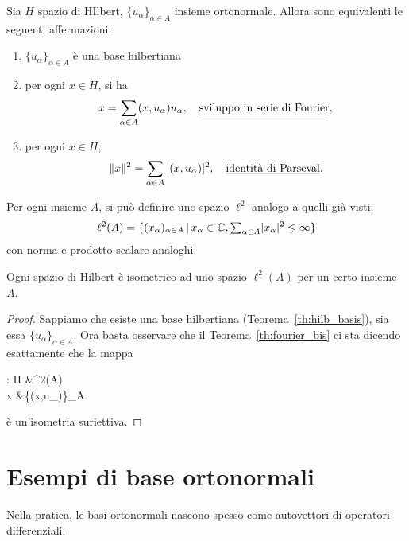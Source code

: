 \begin{theorem}
\label{th:fourier_bis}
	Sia $H$ spazio di HIlbert, $\{u_\alpha\}_{\alpha \in A}$ insieme ortonormale.
	Allora sono equivalenti le seguenti affermazioni:
	\begin{enumerate}
		\item $\{u_\alpha\}_{\alpha \in A}$ è una base hilbertiana
		\item per ogni $x \in H$, si ha
		\begin{equation*}
			x= \sum_{\alpha \in A} (x,u_\alpha)u_\alpha, \quad \text{\underline{sviluppo in serie di Fourier}},
		\end{equation*}
		\item per ogni $x \in H$,
		\begin{equation*}
			\|x\|^2 = \sum_{\alpha \in A} |(x,u_\alpha)|^2, \quad \text{\underline{identità di Parseval}}.
		\end{equation*}
	\end{enumerate}
\end{theorem}

Per ogni insieme $A$, si può definire uno spazio $\ell^2$ analogo a quelli già visti:
\begin{equation*}
	\ell^2(A) = \{(x_\alpha)_{\alpha \in A} \,|\, x_\alpha \in \mathbb{C}, {\textstyle \sum_{\alpha \in A}} |x_\alpha|^2 \lneq \infty \}
\end{equation*}
con norma e prodotto scalare analoghi.

\begin{theorem}
	Ogni spazio di Hilbert è isometrico ad uno spazio $\ell^2(A)$ per un certo insieme $A$.
\end{theorem}
\begin{proof}
	Sappiamo che esiste una base hilbertiana (Teorema~\ref{th:hilb_basis}), sia essa $\{u_\alpha\}_{\alpha \in A}$. Ora basta osservare che il Teorema~\ref{th:fourier_bis} ci sta dicendo esattamente che la mappa
	\begin{eqalign*}
		\varphi : H &\longto \ell^2(A)\\
				x &\longmapsto \{(x,u_\alpha)\}_{\alpha \in A}
	\end{eqalign*}
	è un'isometria suriettiva.
\end{proof}

\section{Esempi di base ortonormali}
Nella pratica, le basi ortonormali nascono spesso come autovettori di operatori differenziali.

